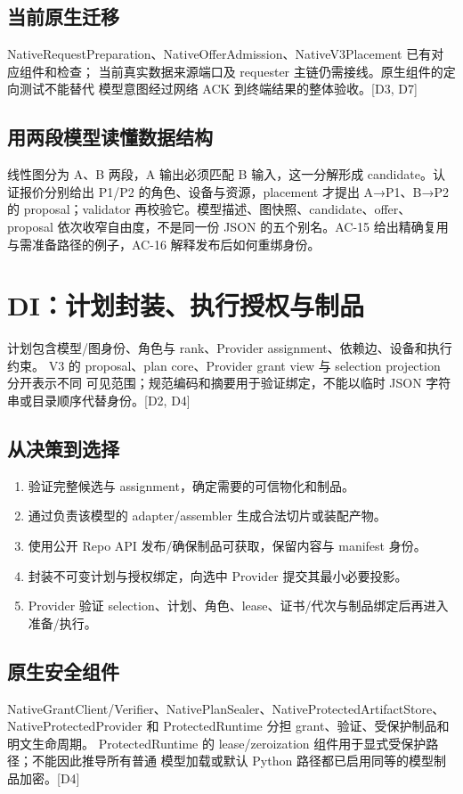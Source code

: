 \subsection{当前原生迁移}
NativeRequestPreparation、NativeOfferAdmission、NativeV3Placement 已有对应组件和检查；
当前真实数据来源端口及 requester 主链仍需接线。原生组件的定向测试不能替代
模型意图经过网络 ACK 到终端结果的整体验收。[D3, D7]


\subsection{用两段模型读懂数据结构}
线性图分为 A、B 两段，A 输出必须匹配 B 输入，这一分解形成 candidate。认证报价分别给出 P1/P2 的角色、设备与资源，placement 才提出 A→P1、B→P2 的 proposal；validator 再校验它。模型描述、图快照、candidate、offer、proposal 依次收窄自由度，不是同一份 JSON 的五个别名。AC-15 给出精确复用与需准备路径的例子，AC-16 解释发布后如何重绑身份。

\newpage

\section{DI：计划封装、执行授权与制品}
计划包含模型/图身份、角色与 rank、Provider assignment、依赖边、设备和执行约束。
V3 的 proposal、plan core、Provider grant view 与 selection projection 分开表示不同
可见范围；规范编码和摘要用于验证绑定，不能以临时 JSON 字符串或目录顺序代替身份。[D2, D4]

\subsection{从决策到选择}
\begin{enumerate}
\item 验证完整候选与 assignment，确定需要的可信物化和制品。
\item 通过负责该模型的 adapter/assembler 生成合法切片或装配产物。
\item 使用公开 Repo API 发布/确保制品可获取，保留内容与 manifest 身份。
\item 封装不可变计划与授权绑定，向选中 Provider 提交其最小必要投影。
\item Provider 验证 selection、计划、角色、lease、证书/代次与制品绑定后再进入准备/执行。
\end{enumerate}

\subsection{原生安全组件}
NativeGrantClient/Verifier、NativePlanSealer、NativeProtectedArtifactStore、
NativeProtectedProvider 和 ProtectedRuntime 分担 grant、验证、受保护制品和明文生命周期。
ProtectedRuntime 的 lease/zeroization 组件用于显式受保护路径；不能因此推导所有普通
模型加载或默认 Python 路径都已启用同等的模型制品加密。[D4]

